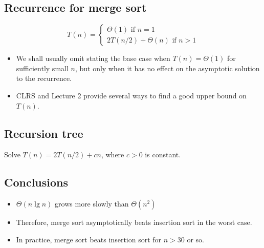 \documentclass[11pt]{elegantbook}
\begin{document}
\subsection{Recurrence for merge sort}
$$
T(n)=\left\{\begin{array}{l}
\Theta(1) \text { if } n=1 \\
2 T(n / 2)+\Theta(n) \text { if } n>1
\end{array}\right.
$$
\begin{note}
  \begin{itemize}
    \item We shall usually omit stating the base case when $T(n)=\Theta(1)$ for sufficiently small $n$, but only when it has no effect on the asymptotic solution to the recurrence. 
    \item CLRS and Lecture 2 provide several ways to find a good upper bound on $T(n)$.
  \end{itemize}
\end{note}
\subsection{Recursion tree}
\begin{example}
  Solve $T(n)=2 T(n / 2)+c n$, where $c>0$ is constant.
\end{example}
\subsection{Conclusions}
\begin{itemize}
  \item $\Theta(n \lg n)$ grows more slowly than $\Theta\left(n^{2}\right)$
  \item Therefore, merge sort asymptotically beats insertion sort in the worst case.
  \item In practice, merge sort beats insertion sort for $n > 30$ or so.            
\end{itemize}
\end{document}
